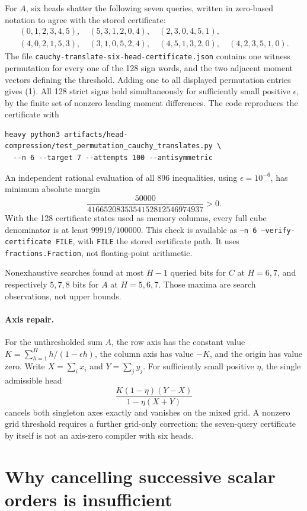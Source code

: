 \documentclass[11pt]{article}
\begin{document}
For $A$, six heads shatter the following seven queries, written
in zero-based notation to agree with the stored certificate:
\[
\begin{gathered}
(0,1,2,3,4,5),\quad(5,3,1,2,0,4),\quad(2,3,0,4,5,1),\\
(4,0,2,1,5,3),\quad(3,1,0,5,2,4),\quad(4,5,1,3,2,0),\quad
(4,2,3,5,1,0).
\end{gathered}
\]
The file \texttt{cauchy-translate-six-head-certificate.json}
contains one witness permutation for every one of the 128 sign
words, and the two adjacent moment vectors defining the threshold.
Adding one to all displayed permutation entries gives (1).
All 128 strict signs hold simultaneously for sufficiently small
positive $\epsilon$, by the finite set of nonzero leading moment
differences. The code reproduces the certificate with
\begin{verbatim}
heavy python3 artifacts/head-compression/test_permutation_cauchy_translates.py \
  --n 6 --target 7 --attempts 100 --antisymmetric
\end{verbatim}
An independent rational evaluation of all 896 inequalities, using
$\epsilon=10^{-6}$, has minimum absolute margin
\[
          \frac{50000}{4166520835354152812546974937}>0.
\]
With the 128 certificate states used as memory columns, every full
cube denominator is at least $99919/100000$. This check is available
as \texttt{--n 6 --verify-certificate FILE}, with \texttt{FILE} the
stored certificate path. It uses \texttt{fractions.Fraction}, not
floating-point arithmetic.

Nonexhaustive searches found at most $H-1$ queried bits for $C$ at
$H=6,7$, and respectively $5,7,8$ bits for $A$ at $H=5,6,7$.
Those maxima are search observations, not upper bounds.

\paragraph{Axis repair.}
For the unthresholded sum $A$, the row axis has the constant value
$K=\sum_{h=1}^H h/(1-\epsilon h)$, the column axis has value $-K$,
and the origin has value zero. Write $X=\sum_i x_i$ and $Y=\sum_jy_j$.
For sufficiently small positive $\eta$, the single admissible head
\[
          \frac{K(1-\eta)(Y-X)}{1-\eta(X+Y)}
\]
cancels both singleton axes exactly and vanishes on the mixed grid.
A nonzero grid threshold requires a further grid-only correction;
the seven-query certificate by itself is not an axis-zero compiler
with six heads.

\section{Why cancelling successive scalar orders is insufficient}
\end{document}
